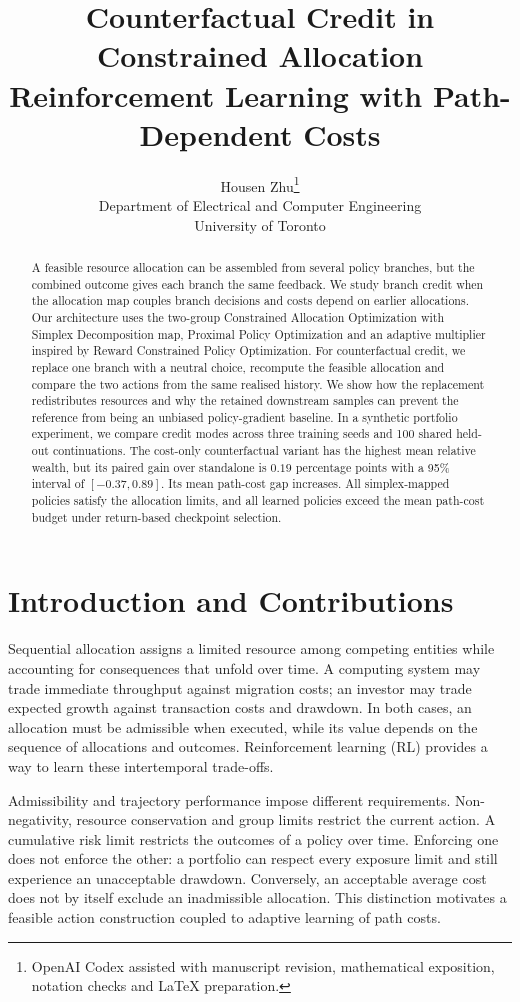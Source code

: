 \documentclass[10pt]{article}
\title{Counterfactual Credit in Constrained Allocation Reinforcement Learning with Path-Dependent Costs}
\author{\name Housen Zhu\thanks{OpenAI Codex assisted with manuscript revision, mathematical exposition, notation checks and LaTeX preparation.}\\
\addr Department of Electrical and Computer Engineering\\
\addr University of Toronto}
\date{}
\begin{document}
\maketitle

\begin{abstract}
A feasible resource allocation can be assembled from several policy branches, but the combined outcome gives each branch the same feedback. We study branch credit when the allocation map couples branch decisions and costs depend on earlier allocations. Our architecture uses the two-group Constrained Allocation Optimization with Simplex Decomposition map, Proximal Policy Optimization and an adaptive multiplier inspired by Reward Constrained Policy Optimization. For counterfactual credit, we replace one branch with a neutral choice, recompute the feasible allocation and compare the two actions from the same realised history. We show how the replacement redistributes resources and why the retained downstream samples can prevent the reference from being an unbiased policy-gradient baseline. In a synthetic portfolio experiment, we compare credit modes across three training seeds and 100 shared held-out continuations. The cost-only counterfactual variant has the highest mean relative wealth, but its paired gain over standalone is $0.19$ percentage points with a 95\% interval of $[-0.37,0.89]$. Its mean path-cost gap increases. All simplex-mapped policies satisfy the allocation limits, and all learned policies exceed the mean path-cost budget under return-based checkpoint selection.
\end{abstract}

\section{Introduction and Contributions}
\label{sec:introduction}

Sequential allocation assigns a limited resource among competing entities while accounting for consequences that unfold over time. A computing system may trade immediate throughput against migration costs; an investor may trade expected growth against transaction costs and drawdown. In both cases, an allocation must be admissible when executed, while its value depends on the sequence of allocations and outcomes. Reinforcement learning (RL) provides a way to learn these intertemporal trade-offs.

Admissibility and trajectory performance impose different requirements. Non-negativity, resource conservation and group limits restrict the current action. A cumulative risk limit restricts the outcomes of a policy over time. Enforcing one does not enforce the other: a portfolio can respect every exposure limit and still experience an unacceptable drawdown. Conversely, an acceptable average cost does not by itself exclude an inadmissible allocation. This distinction motivates a feasible action construction coupled to adaptive learning of path costs.
\end{document}
